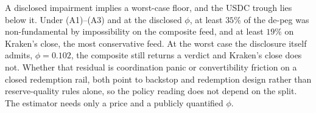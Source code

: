 A disclosed impairment implies a worst-case floor, and the USDC trough lies below it.
Under (A1)--(A3) and at the disclosed $\phi$, at least $35\%$ of the de-peg was non-fundamental by impossibility on the composite feed, and at least $19\%$ on Kraken's
close, the most conservative feed. At the worst case the disclosure itself admits,
$\phi=0.102$, the composite still returns a verdict and Kraken's close does not.
Whether that residual is coordination panic or
convertibility friction on a closed redemption rail, both point to backstop and redemption
design rather than reserve-quality rules alone, so the policy reading does not depend on
the split. The estimator needs only a price and a publicly quantified $\phi$.
